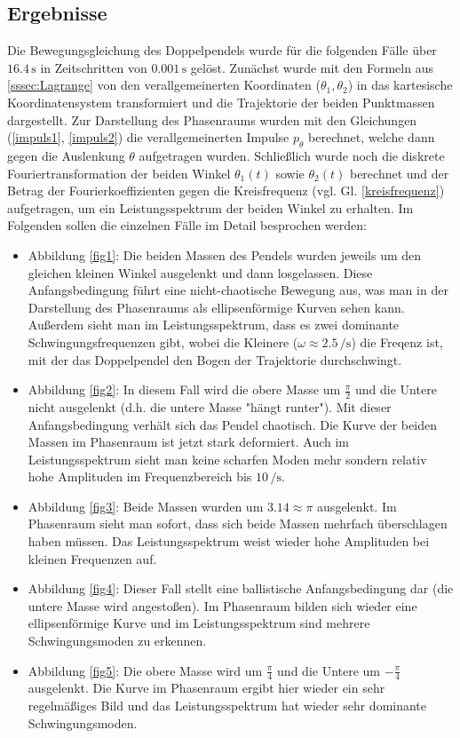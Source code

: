 \documentclass[10pt,a4paper]{article}
\begin{document}
\subsection{Ergebnisse}
Die Bewegungsgleichung des Doppelpendels wurde für die folgenden Fälle über $\num{16.4}\,\si{\second}$ in Zeitschritten von $\num{0.001}\,\si{\second}$ gelöst. Zunächst wurde mit den Formeln aus \ref{sssec:Lagrange} von den verallgemeinerten Koordinaten ($\theta_1, \theta_2$) in das kartesische Koordinatensystem transformiert und die Trajektorie der beiden Punktmassen dargestellt. Zur Darstellung des Phasenraums wurden mit den Gleichungen (\ref{impuls1}, \ref{impuls2}) die verallgemeinerten Impulse $p_\theta$ berechnet, welche dann gegen die Auslenkung $\theta$ aufgetragen wurden. Schließlich wurde noch die diskrete Fouriertransformation der beiden Winkel $\theta_1(t)$ sowie $\theta_2(t)$ berechnet und der Betrag der Fourierkoeffizienten gegen die Kreisfrequenz (vgl. Gl. \ref{kreisfrequenz}) aufgetragen, um ein Leistungsspektrum der beiden Winkel zu erhalten. Im Folgenden sollen die einzelnen Fälle im Detail besprochen werden:
\begin{itemize}
  \item Abbildung \ref{fig1}: Die beiden Massen des Pendels wurden jeweils um den gleichen kleinen Winkel ausgelenkt und dann losgelassen. Diese Anfangsbedingung führt eine nicht-chaotische Bewegung aus, was man in der Darstellung des Phasenraums als ellipsenförmige Kurven sehen kann. Außerdem sieht man im Leistungsspektrum, dass es zwei dominante Schwingungsfrequenzen gibt, wobei die Kleinere ($\omega \approx \num{2.5}\,\si{\per\second}$) die Freqenz ist, mit der das Doppelpendel den Bogen der Trajektorie durchschwingt.
  
  \item Abbildung \ref{fig2}: In diesem Fall wird die obere Masse um $\frac{\pi}{2}$ und die Untere nicht ausgelenkt (d.h. die untere Masse "hängt runter"). Mit dieser Anfangsbedingung verhält sich das Pendel chaotisch. Die Kurve der beiden Massen im Phasenraum ist jetzt stark deformiert. Auch im Leistungsspektrum sieht man keine scharfen Moden mehr sondern relativ hohe Amplituden im Frequenzbereich bis $\num{10}\,\si{\per\second}$.
  
  \item Abbildung \ref{fig3}: Beide Massen wurden um $3.14 \approx \pi$ ausgelenkt. Im Phasenraum sieht man sofort, dass sich beide Massen mehrfach überschlagen haben müssen. Das Leistungsspektrum weist wieder hohe Amplituden bei kleinen Frequenzen auf.
  
  \item Abbildung \ref{fig4}: Dieser Fall stellt eine ballistische Anfangsbedingung dar (die untere Masse wird angestoßen). Im Phasenraum bilden sich wieder eine ellipsenförmige Kurve und im Leistungsspektrum sind mehrere Schwingungsmoden zu erkennen.
  
  \item Abbildung \ref{fig5}: Die obere Masse wird um $\frac{\pi}{4}$ und die Untere um $-\frac{\pi}{4}$ ausgelenkt. Die Kurve im Phasenraum ergibt hier wieder ein sehr regelmäßiges Bild und das Leistungsspektrum hat wieder sehr dominante Schwingungsmoden.
\end{itemize}
\end{document}
